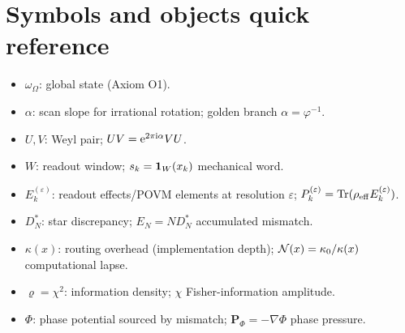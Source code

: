 \section{Symbols and objects quick reference}
\label{app:symbols}

\begin{itemize}
  \item $\omega_{\Omega}$: global state (Axiom O1).
  \item $\alpha$: scan slope for irrational rotation; golden branch $\alpha=\varphi^{-1}$.
  \item $U,V$: Weyl pair; $UV=\mathrm{e}^{2\pi\mathrm{i}\alpha}VU$.
  \item $W$: readout window; $s_k=\mathbf{1}_W(x_k)$ mechanical word.
  \item $E_k^{(\varepsilon)}$: readout effects/POVM elements at resolution $\varepsilon$; $P_k^{(\varepsilon)}=\mathrm{Tr}(\rho_{\mathrm{eff}}E_k^{(\varepsilon)})$.
  \item $D_N^\ast$: star discrepancy; $E_N=ND_N^\ast$ accumulated mismatch.
  \item $\kappa(x)$: routing overhead (implementation depth); $\mathcal{N}(x)=\kappa_0/\kappa(x)$ computational lapse.
  \item $\varrho=\chi^2$: information density; $\chi$ Fisher-information amplitude.
  \item $\Phi$: phase potential sourced by mismatch; $\mathbf{P}_{\Phi}=-\nabla\Phi$ phase pressure.
\end{itemize}


